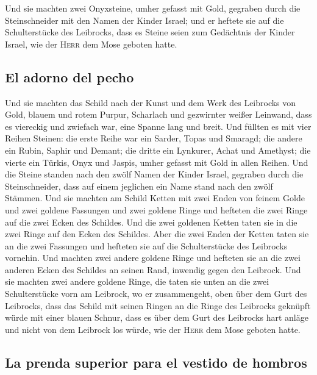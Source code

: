  Und sie machten zwei Onyxsteine, umher gefasst mit Gold,
gegraben durch die Steinschneider mit den Namen der Kinder Israel;
 und er heftete sie auf die Schulterstücke des Leibrocks,
dass es Steine seien zum Gedächtnis der Kinder Israel, wie der
\textsc{Herr} dem Mose geboten hatte.

\hypertarget{el-adorno-del-pecho}{%
\subsection{El adorno del pecho}\label{el-adorno-del-pecho}}

 Und sie machten das Schild nach der Kunst und dem Werk
des Leibrocks von Gold, blauem und rotem Purpur, Scharlach und
gezwirnter weißer Leinwand,  dass es viereckig und
zwiefach war, eine Spanne lang und breit.  Und füllten es
mit vier Reihen Steinen: die erste Reihe war ein Sarder, Topas und
Smaragd;  die andere ein Rubin, Saphir und Demant;
 die dritte ein Lynkurer, Achat und Amethyst;
 die vierte ein Türkis, Onyx und Jaspis, umher gefasst
mit Gold in allen Reihen.  Und die Steine standen nach
den zwölf Namen der Kinder Israel, gegraben durch die Steinschneider,
dass auf einem jeglichen ein Name stand nach den zwölf Stämmen.
 Und sie machten am Schild Ketten mit zwei Enden von
feinem Golde  und zwei goldene Fassungen und zwei goldene
Ringe und hefteten die zwei Ringe auf die zwei Ecken des Schildes.
 Und die zwei goldenen Ketten taten sie in die zwei Ringe
auf den Ecken des Schildes.  Aber die zwei Enden der
Ketten taten sie an die zwei Fassungen und hefteten sie auf die
Schulterstücke des Leibrocks vornehin.  Und machten zwei
andere goldene Ringe und hefteten sie an die zwei anderen Ecken des
Schildes an seinen Rand, inwendig gegen den Leibrock. 
Und sie machten zwei andere goldene Ringe, die taten sie unten an die
zwei Schulterstücke vorn am Leibrock, wo er zusammengeht, oben über dem
Gurt des Leibrocks,  dass das Schild mit seinen Ringen an
die Ringe des Leibrocks geknüpft würde mit einer blauen Schnur, dass es
über dem Gurt des Leibrocks hart anläge und nicht von dem Leibrock los
würde, wie der \textsc{Herr} dem Mose geboten hatte.

\hypertarget{la-prenda-superior-para-el-vestido-de-hombros-1}{%
\subsection{La prenda superior para el vestido de
hombros}\label{la-prenda-superior-para-el-vestido-de-hombros-1}}

